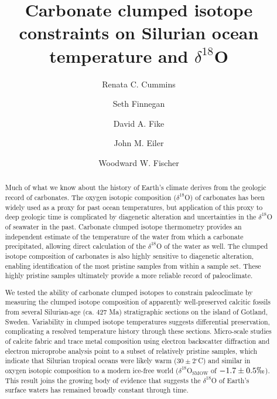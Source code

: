 \documentclass[5p, authoryear]{elsarticle}
\newcommand{\deltao}{$\delta^{18}$}
\newcommand{\degrees}{$^{\circ}$}
\begin{document}
\begin{frontmatter}

\title{Carbonate clumped isotope constraints on Silurian ocean temperature and \deltao O}

\author[caltech]{Renata C. Cummins}

\author[berkley]{Seth Finnegan}

\author[washU]{David A. Fike}

\author[caltech]{John M. Eiler}

\author[caltech]{Woodward W. Fischer}


\address[caltech]{California Institute of Technology, Geological and Planetary Sciences, MC 100-23, Pasadena, CA 91125}

\address[berkley]{Department of Integrative Biology, University of California, 1005 Valley Life Sciences Bldg \#3140, Berkeley, CA 94720}

\address[washU]{Department of Earth and Planetary Sciences, Washington University, St. Louis, Missouri 63130}


\begin{abstract}
Much of what we know about the history of Earth's climate derives from the geologic record of carbonates. The oxygen isotopic composition (\deltao O) of carbonates has been widely used as a proxy for past ocean temperatures, but application of this proxy to deep geologic time is complicated by diagenetic alteration and uncertainties in the \deltao O of seawater in the past. Carbonate clumped isotope thermometry provides an independent estimate of the temperature of the water from which a carbonate precipitated, allowing direct calculation of the \deltao O of the water as well. The clumped isotope composition of carbonates is also highly sensitive to diagenetic alteration, enabling identification of the most pristine samples from within a sample set. These highly pristine samples ultimately provide a more reliable record of paleoclimate.

We tested the ability of carbonate clumped isotopes to constrain paleoclimate by measuring the clumped isotope composition of apparently well-preserved calcitic fossils from several Silurian-age (ca. 427 Ma) stratigraphic sections on the island of Gotland, Sweden. Variability in clumped isotope temperatures suggests differential preservation, complicating a resolved temperature history through these sections. Micro-scale studies of calcite fabric and trace metal composition using electron backscatter diffraction and electron microprobe analysis point to a subset of relatively pristine samples, which indicate that Silurian tropical oceans were likely warm ($30\pm 2$\degrees C) and similar in oxygen isotopic composition to a modern ice-free world (\deltao O$_{\text{SMOW}}$ of $-1.7\pm 0.5\permil$). This result joins the growing body of evidence that suggests the $\delta^{18}$O of Earth's surface waters has remained broadly constant through time. 
\end{abstract}

\end{frontmatter}
\end{document}
